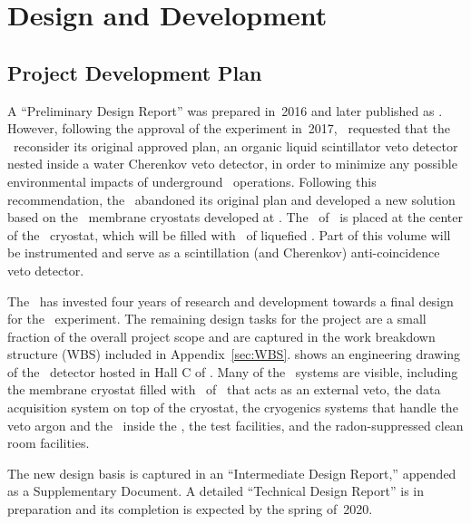 \section{Design and Development}


\subsection{Project Development Plan}

A ``Preliminary Design Report'' was prepared in~2016 and later published as .  However, following the approval of the experiment in~2017, \LNGS\ requested that the \GADMC\ reconsider its original approved plan, an organic liquid scintillator veto detector nested inside a water Cherenkov veto detector, in order to minimize any possible environmental impacts of underground \LNGS\ operations.  Following this recommendation, the \GADMC\ abandoned its original plan and developed a new solution based on the \pDUNE\ membrane cryostats developed at \CERN.  The \LArTPC\ of \DSks\ is placed at the center of the \pDUNE\ cryostat, which will be filled with \pDUNELArMass\ of liquefied \AAr. Part of this volume will be instrumented and serve as a scintillation (and Cherenkov) anti-coincidence veto detector.

The \GADMC\ has invested four years of research and development towards a final design for the \DSks\ experiment.  The remaining design tasks for the project are a small fraction of the overall project scope and are captured in the work breakdown structure (WBS) included in Appendix~\ref{sec:WBS}.   shows an engineering drawing of the \DSks\ detector hosted in Hall C of \LNGS.  Many of the \DSks\ systems are visible, including the membrane cryostat filled with \pDUNELArMass\ of \AAr\ that acts as an external veto, the data acquisition system on top of the cryostat, the cryogenics systems that handle the veto argon and the \UAr\ inside the \TPC, the test facilities, and the radon-suppressed clean room facilities.

The new design basis is captured in an ``Intermediate Design Report,'' appended as a Supplementary Document.  A detailed ``Technical Design Report'' is in preparation and its completion is expected by the spring of~2020.

